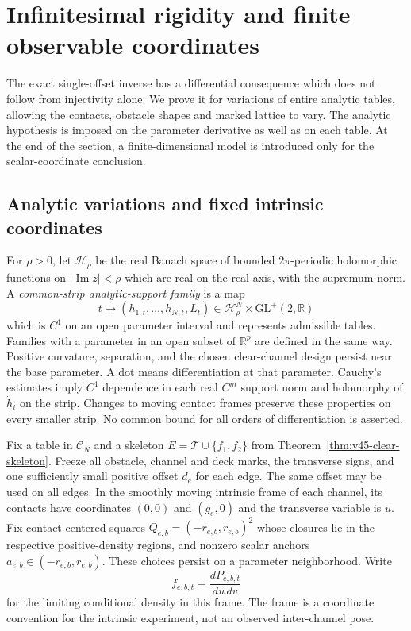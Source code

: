 \section{Infinitesimal rigidity and finite observable coordinates}
\label{sec:v48-differential}

The exact single-offset inverse has a differential consequence which does
not follow from injectivity alone.  We prove it for variations of entire
analytic tables, allowing the contacts, obstacle shapes and marked lattice
to vary.  The analytic hypothesis is imposed on the parameter derivative
as well as on each table.  At the end of the section, a finite-dimensional
model is introduced only for the scalar-coordinate conclusion.

\subsection{Analytic variations and fixed intrinsic coordinates}

For $\rho>0$, let $\mathcal H_\rho$ be the real Banach space of bounded
$2\pi$-periodic holomorphic functions on $|\operatorname{Im}z|<\rho$
which are real on the real axis, with the supremum norm.  A
\emph{common-strip analytic-support family} is a map
\begin{equation}\label{eq:v48-support-family}
 t\longmapsto (h_{1,t},\ldots,h_{N,t},L_t)
       \in\mathcal H_\rho^N\times\mathrm{GL}^+(2,\mathbb R)
\end{equation}
which is $C^1$ on an open parameter interval and represents admissible
tables.  Families with a parameter in an open subset of $\mathbb R^p$
are defined in the same way.  Positive curvature, separation, and the
chosen clear-channel design persist near the base parameter.  A dot
means differentiation at that parameter.  Cauchy's estimates imply
$C^1$ dependence in each real $C^m$ support norm and holomorphy of
$\dot h_i$ on the strip.  Changes to moving contact frames preserve
these properties on every smaller strip.  No common bound for all
orders of differentiation is asserted.

Fix a table in $\mathscr C_N$ and a skeleton
$E=\mathcal T\cup\{f_1,f_2\}$ from
Theorem~\ref{thm:v45-clear-skeleton}.  Freeze all obstacle, channel and
deck marks, the transverse signs, and one sufficiently small positive
offset $d_e$ for each edge.  The same offset may be used on all edges.
In the smoothly moving intrinsic frame of each channel, its contacts
have coordinates $(0,0)$ and $(g_e,0)$ and the transverse variable is
$u$.  Fix contact-centered squares $Q_{e,b}=(-r_{e,b},r_{e,b})^2$ whose
closures lie in the respective positive-density regions, and nonzero scalar
anchors $a_{e,b}\in(-r_{e,b},r_{e,b})$.  These choices persist on a
parameter neighborhood.  Write
\[
       f_{e,b,t}=\frac{dP_{e,b,t}}{du\,dv}
\]
for the limiting conditional density in this frame.  The frame is a
coordinate convention for the intrinsic experiment, not an observed
inter-channel pose.

